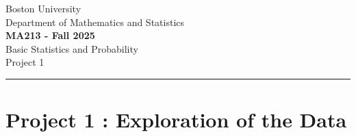\documentclass[12pt]{article}
\begin{document}
	
	
	
	\begin{center}		
        Boston University \\
        Department of Mathematics and Statistics \\ 
		\Large{\textbf{MA213 - Fall 2025}} \\ 
        \large{Basic Statistics and Probability} \\
        \large{Project 1} \\ 
		\noindent\rule{16cm}{2pt}
	\end{center}
	
	
\section*{Project 1 : Exploration of the Data}
\end{document}
